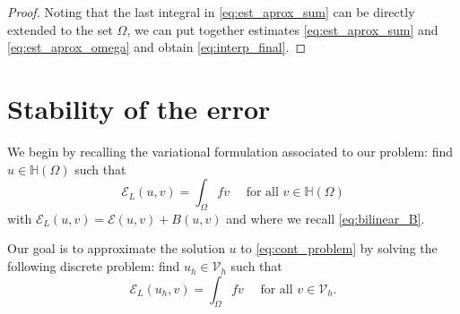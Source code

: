 \documentclass[11 pt]{article}
\numberwithin{equation}{section}
\def\cE{\mathcal{E}}
\begin{document}
\begin{proof}
Noting that the last integral in \eqref{eq:est_aprox_sum} can be directly extended to the set $\Omega$, we can put together estimates \eqref{eq:est_aprox_sum} and \eqref{eq:est_aprox_omega} and obtain \eqref{eq:interp_final}.
\end{proof}
%


\section{Stability of the error}\label{sec:error}

We begin by recalling the variational formulation associated to our problem: find $u\in\mathbb H(\Omega)$ such that 
%
\begin{equation}\label{eq:cont_problem}
    \cE_{L}(u,v)=\int_{\Omega}f v \quad \text{ for all } v\in \mathbb H(\Omega)
\end{equation}
%
with $\cE_{L}(u,v)=\cE(u,v)+B(u,v)$ and where we recall \eqref{eq:bilinear_B}.

Our goal is to approximate the solution $u$ to \eqref{eq:cont_problem} by solving the following discrete problem: find $u_h\in \mathcal V_h$ such that
%
\begin{equation}\label{eq:discr_problem}
    \cE_{L}(u_h,v)=\int_{\Omega} f v \quad \text{ for all } v\in \mathcal V_h.
\end{equation}
%
\end{document}
